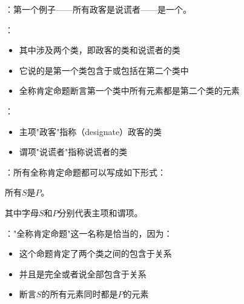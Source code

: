 \begin{examplebox}[title=全称肯定命题（A命题）]
：第一个例子——所有政客是说谎者——是一个。

：
\begin{itemize}
  \item 其中涉及两个类，即政客的类和说谎者的类
  \item 它说的是第一个类包含于或包括在第二个类中
  \item 全称肯定命题断言第一个类中所有元素都是第二个类的元素
\end{itemize}

：
\begin{itemize}
  \item 主项"政客"指称（designate）政客的类
  \item 谓项"说谎者"指称说谎者的类
\end{itemize}

：所有全称肯定命题都可以写成如下形式：

\begin{center}
所有$S$是$P$。
\end{center}

其中字母$S$和$P$分别代表主项和谓项。

："全称肯定命题"这一名称是恰当的，因为：
\begin{itemize}
  \item 这个命题肯定了两个类之间的包含于关系
  \item 并且是完全或者说全部包含于关系
  \item 断言$S$的所有元素同时都是$P$的元素
\end{itemize}
\end{examplebox}

